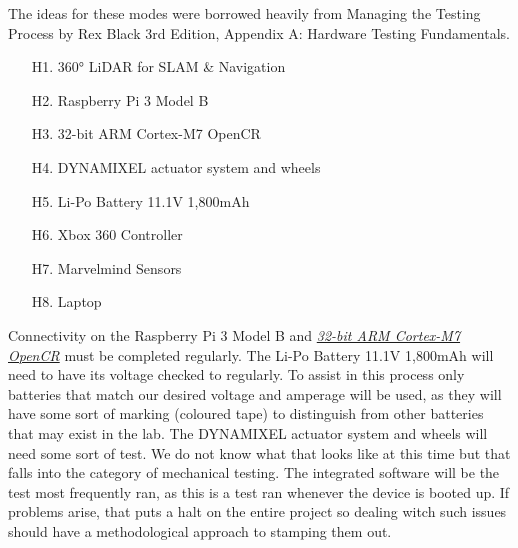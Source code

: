 \documentclass[english,12pt]{article}
\begin{document}
The ideas for these modes were borrowed heavily from Managing the Testing Process by Rex Black 3rd Edition, 
Appendix A: Hardware Testing Fundamentals. 
\begin{itemize}
\item[H1.] \ang{360} LiDAR for SLAM \& Navigation
\item[H2.] Raspberry Pi 3 Model B
\item[H3.] 32-bit ARM Cortex-M7 OpenCR
\item[H4.] DYNAMIXEL actuator system and wheels
\item[H5.] Li-Po Battery 11.1V 1,800mAh 
\item[H6.] Xbox 360 Controller 
\item[H7.] Marvelmind Sensors
\item[H8.] Laptop 
\end{itemize}
Connectivity on the Raspberry Pi 3 Model B and 
\href{http://emanual.robotis.com/docs/en/parts/controller/opencr10/}{\textit{32-bit ARM Cortex-M7 OpenCR}} 
must be completed regularly. The Li-Po Battery 11.1V 1,800mAh will need to have its voltage checked to 
regularly. To assist in this process only batteries that match our desired voltage and amperage will be 
used, as they will have some sort of marking (coloured tape) to distinguish from other batteries that may 
exist in the lab. The DYNAMIXEL actuator system and wheels will need some sort of test. We do not know what 
that looks like at this time but that falls into the category of mechanical testing. The integrated software 
will be the test most frequently ran, as this is a test ran whenever the device is booted up. If problems arise, 
that puts a halt on the entire project so dealing witch such issues should have a methodological approach to stamping 
them out. 
\newpage
\end{document}
